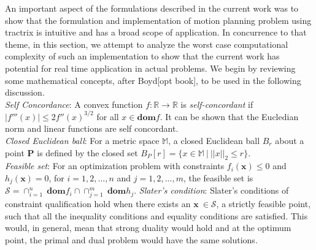 \documentclass[12pt,a4]{article}
\begin{document}
An important aspect of the formulations described in the current work was to show that the formulation and implementation of motion planning problem using tractrix is intuitive and has a broad scope of application. In concurrence to that theme, in this section, we attempt to analyze the worst case computational complexity of such an implementation to show that the current work has potential for real time application in actual problems. We begin by reviewing some mathematical concepts, after Boyd[opt book], to be used in the following discussion.\\
\indent \textit{Self Concordance}: A convex function $f: \mathbb{R} \to \mathbb{R}$ is \textit{self-concordant} if $|f'''(x)|\leq 2f''(x)^{3/2}$ for all $x \in \textbf{dom}f$. It can be shown that the Eucledian norm and linear functions are self concordant.\\
\indent \textit{Closed Euclidean ball}: For a metric space $\mathbb{M}$, a closed Euclidean ball $B_r$ about a point $\textbf{P}$ is defined by the closed set $B_P\left[r \right] =\{x\in \mathbb{M} ~| ~||x||_2 \leq r\}$. \\
\indent \textit{Feasible set}: For an optimization problem with constraints $f_i(\textbf{x})\leq 0$ and $h_j(\textbf{x})=0$, for $i=1,2,...,n$ and $j=1,2,...,m$, the feasible set is $\mathcal{S}=\cap_{i=1}^n~\textbf{dom}f_i\cap\cap_{j=1}^m~\textbf{dom}h_j$. 
\indent \textit{Slater's condition}: Slater's conditions of constraint qualification hold when there exists an $\textbf{x}~ \in \mathcal{S}$, a strictly feasible point,  such that all the inequality conditions and equality conditions are satisfied. This would, in general, mean that strong duality would hold and at the optimum point, the primal and dual problem would have the same solutions.\\
\end{document}
